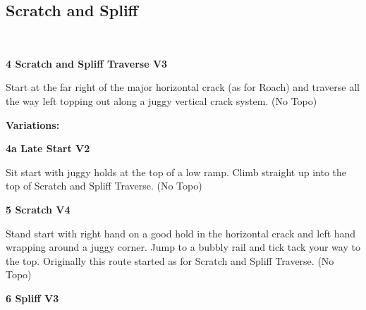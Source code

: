 \begin{multicols}{2}
\begin{minipage}{\columnwidth}
			\subsection*{Scratch and Spliff}\label{bf:Scratch and Spliff}
			\
			
			\end{minipage}
			
					\begin{minipage}{\linewidth}	
					\label{rt:Scratch and Spliff Traverse}
\colorbox{green!20}{
\parbox{0.95\textwidth}{
\textbf{
4 Scratch and Spliff Traverse V3     
}
}
}

					\begin{adjustwidth}{0.5cm}{}				
					Start at the far right of the major horizontal crack (as for Roach) and traverse all the way left topping out along a juggy vertical crack system.
						\newline (No Topo) 
					\end{adjustwidth}
					\end{minipage}
						\begin{adjustwidth}{0.5cm}{}				
						\textbf{Variations:} \newline
							\begin{minipage}{\linewidth}	
							\label{vr:Late Start}
\colorbox{green!20}{
\parbox{0.95\textwidth}{
\textbf{
4a Late Start V2    
}
}
}

							\begin{adjustwidth}{0.5cm}{}				
							Sit start with juggy holds at the top of a low ramp. Climb straight up into the top of Scratch and Spliff Traverse.
								\newline (No Topo) 
							\end{adjustwidth}
							\end{minipage}
						\end{adjustwidth}
					\begin{minipage}{\linewidth}	
					\label{rt:Scratch}
\colorbox{RoyalBlue!20}{
\parbox{0.95\textwidth}{
\textbf{
5 Scratch V4    
}
}
}

					\begin{adjustwidth}{0.5cm}{}				
					Stand start with right hand on a good hold in the horizontal crack and left hand wrapping around a juggy corner. Jump to a bubbly rail and tick tack your way to the top. Originally this route started as for Scratch and Spliff Traverse.
						\newline (No Topo) 
					\end{adjustwidth}
					\end{minipage}
					\begin{minipage}{\linewidth}	
					\label{rt:Spliff}
\colorbox{green!20}{
\parbox{0.95\textwidth}{
\textbf{
6 Spliff V3     \warn 
}
}
}


\end{minipage}
\end{multicols}

